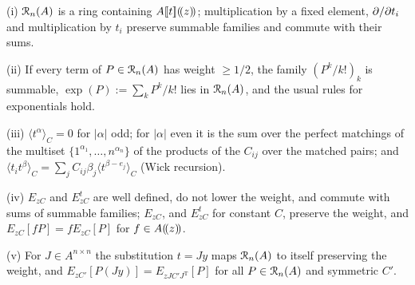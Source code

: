 \begin{lem}
\label{lem:fsp-ring}
(i) $\mathcal{R}_n(A)$ is a ring containing $A[\![ t ]\!](\!(z)\!)$; multiplication by a fixed element, $\partial/\partial t_i$ and multiplication by $t_i$ preserve summable families and commute with their sums.

(ii) If every term of $P\in\mathcal{R}_n(A)$ has weight $\geq1/2$, the family $(P^k/k!)_k$ is summable, $\exp(P):=\sum_kP^k/k!$ lies in $\mathcal{R}_n(A)$, and the usual rules for exponentials hold.

(iii) $\langle t^\alpha\rangle_C=0$ for $|\alpha|$ odd; for $|\alpha|$ even it is the sum over the perfect matchings of the multiset $\{1^{\alpha_1},\dots,n^{\alpha_n}\}$ of the products of the $C_{ij}$ over the matched pairs; and $\langle t_it^\beta\rangle_C=\sum_jC_{ij}\beta_j\langle t^{\beta-e_j}\rangle_C$ (Wick recursion).

(iv) $E_{zC}$ and $E^t_{zC}$ are well defined, do not lower the weight, and commute with sums of summable families; $E_{zC}$, and $E^t_{zC}$ for constant $C$, preserve the weight, and $E_{zC}[fP]=fE_{zC}[P]$ for $f\in A(\!(z)\!)$.

(v) For $J\in A^{n\times n}$ the substitution $t=Jy$ maps $\mathcal{R}_n(A)$ to itself preserving the weight, and $E_{zC'}[P(Jy)]=E_{zJC'J^{\mathrm T}}[P]$ for all $P\in\mathcal{R}_n(A)$ and symmetric $C'$.
\end{lem}

